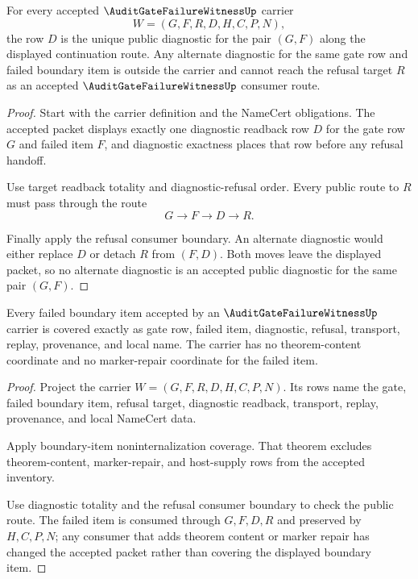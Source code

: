 \begin{theorem}
\label{thm:audit-gate-failure-witness-diagnostic-uniqueness}
For every accepted $\AuditGateFailureWitnessUp$ carrier
$$
W=(G,F,R,D,H,C,P,N),
$$
the row $D$ is the unique public diagnostic for the pair $(G,F)$ along the displayed continuation route. Any alternate diagnostic for the same gate row and failed boundary item is outside the carrier and cannot reach the refusal target $R$ as an accepted $\AuditGateFailureWitnessUp$ consumer route.
\end{theorem}
\begin{proof}
Start with the carrier definition and the NameCert obligations. The accepted packet displays exactly one diagnostic readback row $D$ for the gate row $G$ and failed item $F$, and diagnostic exactness places that row before any refusal handoff.

Use target readback totality and diagnostic-refusal order. Every public route to $R$ must pass through the route
$$
G \to F \to D \to R.
$$

Finally apply the refusal consumer boundary. An alternate diagnostic would either replace $D$ or detach $R$ from $(F,D)$. Both moves leave the displayed packet, so no alternate diagnostic is an accepted public diagnostic for the same pair $(G,F)$.
\end{proof}

\begin{theorem}
\label{thm:audit-gate-failure-witness-boundary-item-coverage}
Every failed boundary item accepted by an $\AuditGateFailureWitnessUp$ carrier is covered exactly as gate row, failed item, diagnostic, refusal, transport, replay, provenance, and local name. The carrier has no theorem-content coordinate and no marker-repair coordinate for the failed item.
\end{theorem}
\begin{proof}
Project the carrier $W=(G,F,R,D,H,C,P,N)$. Its rows name the gate, failed boundary item, refusal target, diagnostic readback, transport, replay, provenance, and local NameCert data.

Apply boundary-item noninternalization coverage. That theorem excludes theorem-content, marker-repair, and host-supply rows from the accepted inventory.

Use diagnostic totality and the refusal consumer boundary to check the public route. The failed item is consumed through $G,F,D,R$ and preserved by $H,C,P,N$; any consumer that adds theorem content or marker repair has changed the accepted packet rather than covering the displayed boundary item.
\end{proof}

